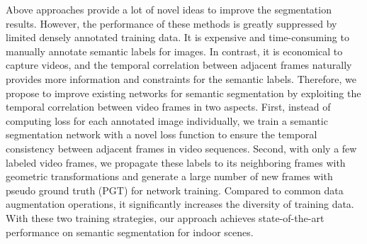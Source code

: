 Above approaches provide a lot of novel ideas to improve the segmentation results. However, the performance of these methods is greatly suppressed by limited densely annotated training data.
%
It is expensive and time-consuming to manually annotate semantic labels for images. 
%
In contrast, it is economical to capture videos, and the temporal correlation between adjacent frames naturally provides more information and constraints for the semantic labels. 
%
Therefore, we propose to improve existing networks for semantic segmentation by exploiting the temporal correlation between video frames in two aspects.
%
First, instead of computing loss for each annotated image individually, we train a semantic segmentation network with a novel loss function to ensure the temporal consistency between adjacent frames in video sequences.
%
Second, with only a few labeled video frames, we propagate these labels to its neighboring frames with geometric transformations and generate a large number of new frames with pseudo ground truth (PGT) for network training. 
Compared to common data augmentation operations, it significantly increases the diversity of training data.
With these two training strategies, our approach achieves state-of-the-art performance on semantic segmentation for indoor scenes. 
%
